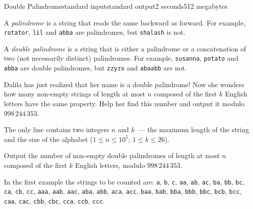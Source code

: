 \begin{problem}{Double Palindrome}{standard input}{standard output}{2 seconds}{512 megabytes}

A \textit{palindrome} is a string that reads the same backward as forward. For example, \texttt{rotator}, \texttt{lil} and \texttt{abba} are palindromes, but \texttt{shalash} is not.

A \textit{double palindrome} is a string that is either a palindrome or a concatenation of two (not necessarily distinct) palindromes. For example, \texttt{susanna}, \texttt{potato} and \texttt{abba} are double palindromes, but \texttt{zzyzx} and \texttt{abaabb} are not.

Dalila has just realized that her name is a double palindrome! Now she wonders how many non-empty strings of length at most $n$ composed of the first $k$ English letters have the same property. Help her find this number and output it modulo $998\,244\,353$.


\InputFile
The only line contains two integers $n$ and $k$~--- the maximum length of the string and the size of the alphabet ($1 \le n \le 10^5$; $1 \le k \le 26$).

\OutputFile
Output the number of non-empty double palindromes of length at most $n$ composed of the first $k$ English letters, modulo $998\,244\,353$.

\Examples

\begin{example}
%
%
%
\end{example}

\Note
In the first example the strings to be counted are: \texttt{a}, \texttt{b}, \texttt{c}, \texttt{aa}, \texttt{ab}, \texttt{ac}, \texttt{ba}, \texttt{bb}, \texttt{bc}, \texttt{ca}, \texttt{cb}, \texttt{cc}, \texttt{aaa}, \texttt{aab}, \texttt{aac}, \texttt{aba}, \texttt{abb}, \texttt{aca}, \texttt{acc}, \texttt{baa}, \texttt{bab}, \texttt{bba}, \texttt{bbb}, \texttt{bbc}, \texttt{bcb}, \texttt{bcc}, \texttt{caa}, \texttt{cac}, \texttt{cbb}, \texttt{cbc}, \texttt{cca}, \texttt{ccb}, \texttt{ccc}.

\end{problem}

